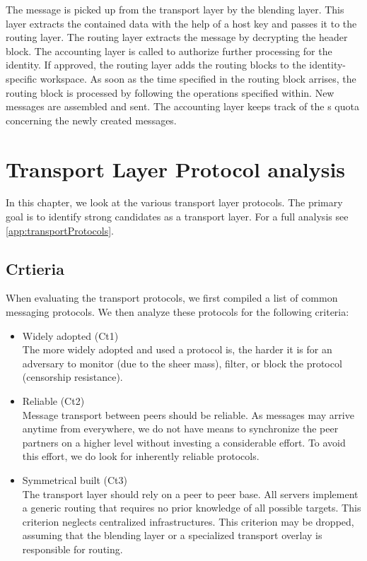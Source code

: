 The message is picked up from the transport layer by the blending layer. This layer extracts the contained data with the help of a host key and passes it to the routing layer. The routing layer extracts the message by decrypting the header block. The accounting layer is called to authorize further processing for the identity. If approved, the routing layer adds the routing blocks to the identity-specific workspace. As soon as the time specified in the routing block arrises, the routing block is processed by following the operations specified within. New messages are assembled and sent. The accounting layer keeps track of the s quota concerning the newly created messages. 

\chapter{Transport Layer Protocol analysis\label{sec:existingTPP}}
In this chapter, we look at the various transport layer protocols. The primary goal is to identify strong candidates as a transport layer. For a full analysis see \ref{app:transportProtocols}.

\section{Crtieria}
When evaluating the transport protocols, we first compiled a list of common messaging protocols. We then analyze these protocols for the following criteria:
\begin{itemize}
	\item Widely adopted (Ct1)\\
	The more widely adopted and used a protocol is, the harder it is for an adversary to monitor (due to the sheer mass), filter, or block the protocol (censorship resistance).
	\item Reliable (Ct2)\\
	Message transport between peers should be reliable. As messages may arrive anytime from everywhere, we do not have means to synchronize the peer partners on a higher level without investing a considerable effort. To avoid this effort, we do look for inherently reliable protocols.
	\item Symmetrical built (Ct3)\\
	The transport layer should rely on a peer to peer base. All servers implement a generic routing that requires no prior knowledge of all possible targets. This criterion neglects centralized infrastructures. This criterion may be dropped, assuming that the blending layer or a specialized transport overlay is responsible for routing.
\end{itemize}

